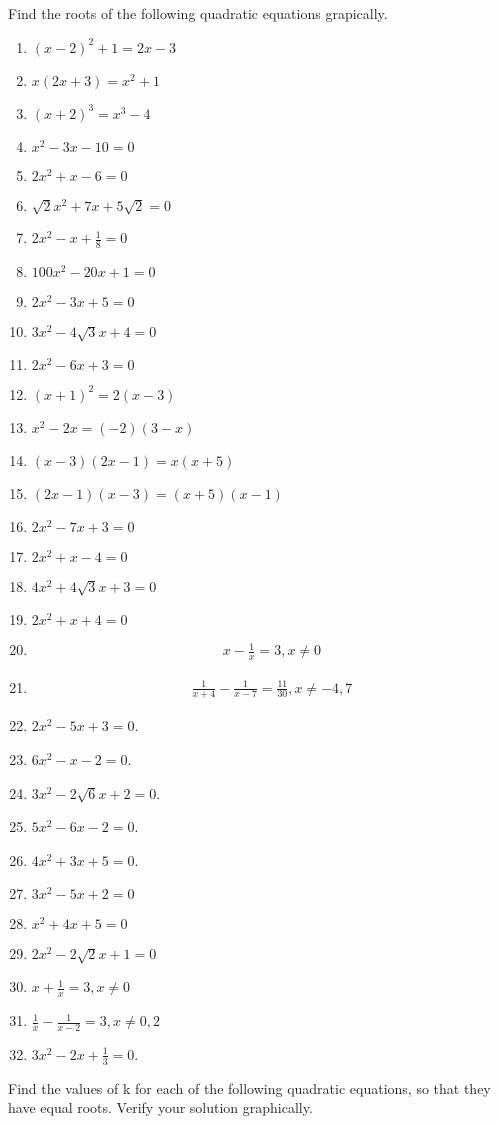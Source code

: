 Find the roots of the following quadratic  equations grapically.
\begin{enumerate}[label=\thesubsection.\arabic*,ref=\thesubsection.\theenumi]
\item $(x-2)^2+1=2x-3$
\item $x(2x+3) = x^2+1$
\item $(x+2)^3 = x^3-4$
\item $x^2-3x-10=0$
\item $2x^2+x-6=0$
\item $ \sqrt 2x^2+7x+5 \sqrt 2=0$
\item $2x^2-x+\frac{1}{8}=0$
\item $100x^2-20x+1=0$
\item $2x^2-3x+5=0$
\item $3x^2-4 \sqrt 3x+4=0$
\item $2x^2-6x+3=0$
\item $(x+1)^2=2(x-3)$
\item $x^2-2x=(-2)(3-x)$
\item $(x-3)(2x-1)=x(x+5)$
\item $(2x-1)(x-3)=(x+5)(x-1)$
\item
$2x^2-7x+3=0$
\item
$2x^2+x-4=0$
\item
$4x^2+4\sqrt 3x+3=0$
\item
$2x^2+x+4=0$
\item
\begin{align}
x-\frac{1}{x}=3, x\neq{0}
\end{align}
\item
\begin{align}
\frac{1}{x+4}-\frac{1}{x-7}=\frac{11}{30}, x\neq{-4,7}
\end{align}
\item $2x^2 -5x+3 = 0$.
\item $6x^2 -x-2 = 0$.
\item $3x^2 -2\sqrt6x+2 = 0$.
\item $5x^2-6x-2 = 0$. 
\item $4x^2+3x+5 = 0$. 
\item $3x^2-5x+2 = 0$
\item $x^2+4x+5 = 0$
\item $2x^2-2\sqrt 2x+1 = 0$
\item $x+\frac{1}{x} = 3,x\neq0$
\item $\frac{1}{x}-\frac{1}{x-2} = 3, x\neq 0,2$
\item $3x^2-2x+\frac{1}{3} = 0$. 
\end{enumerate}
Find the values of k for each of the following quadratic equations, so that they have equal roots.  Verify your solution graphically.
